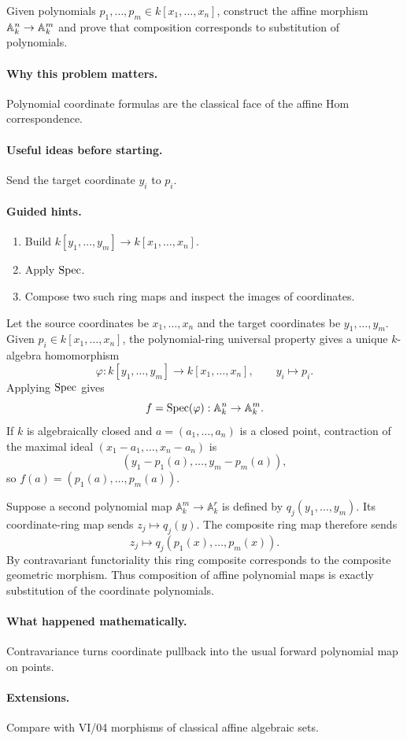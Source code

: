 \begin{problem}\label{prob:vi19-p06}
Given polynomials $p_1,\dots,p_m\in k[x_1,\dots,x_n]$, construct the affine morphism $\mathbb A^n_k\to\mathbb A^m_k$ and prove that composition corresponds to substitution of polynomials.
\end{problem}

\ifdefined\FullProblemDossiers
\paragraph{Why this problem matters.}
Polynomial coordinate formulas are the classical face of the affine Hom correspondence.

\paragraph{Useful ideas before starting.}
Send the target coordinate $y_i$ to $p_i$.

\paragraph{Guided hints.}
\begin{enumerate}
\item Build $k[y_1,\dots,y_m]\to k[x_1,\dots,x_n]$.
\item Apply $\operatorname{Spec}$.
\item Compose two such ring maps and inspect the images of coordinates.
\end{enumerate}

\begin{solution}
Let the source coordinates be \(x_1,\ldots,x_n\) and the target coordinates be \(y_1,\ldots,y_m\).  Given \(p_i\in k[x_1,\ldots,x_n]\), the polynomial-ring universal property gives a unique \(k\)-algebra homomorphism
\[
\varphi:k[y_1,\ldots,y_m]\to k[x_1,\ldots,x_n],
\qquad y_i\longmapsto p_i.
\]
Applying \(\operatorname{Spec}\) gives
\[
f=\operatorname{Spec}(\varphi):\mathbb A_k^n\to\mathbb A_k^m.
\]
If \(k\) is algebraically closed and \(a=(a_1,\ldots,a_n)\) is a closed point, contraction of the maximal ideal \((x_1-a_1,\ldots,x_n-a_n)\) is
\[
(y_1-p_1(a),\ldots,y_m-p_m(a)),
\]
so \(f(a)=(p_1(a),\ldots,p_m(a))\).

Suppose a second polynomial map \(\mathbb A_k^m\to\mathbb A_k^r\) is defined by \(q_j(y_1,\ldots,y_m)\).  Its coordinate-ring map sends \(z_j\mapsto q_j(y)\).  The composite ring map therefore sends
\[
z_j\longmapsto q_j(p_1(x),\ldots,p_m(x)).
\]
By contravariant functoriality this ring composite corresponds to the composite geometric morphism.  Thus composition of affine polynomial maps is exactly substitution of the coordinate polynomials.
\end{solution}

\paragraph{What happened mathematically.}
Contravariance turns coordinate pullback into the usual forward polynomial map on points.

\paragraph{Extensions.}
Compare with VI/04 morphisms of classical affine algebraic sets.
\fi
